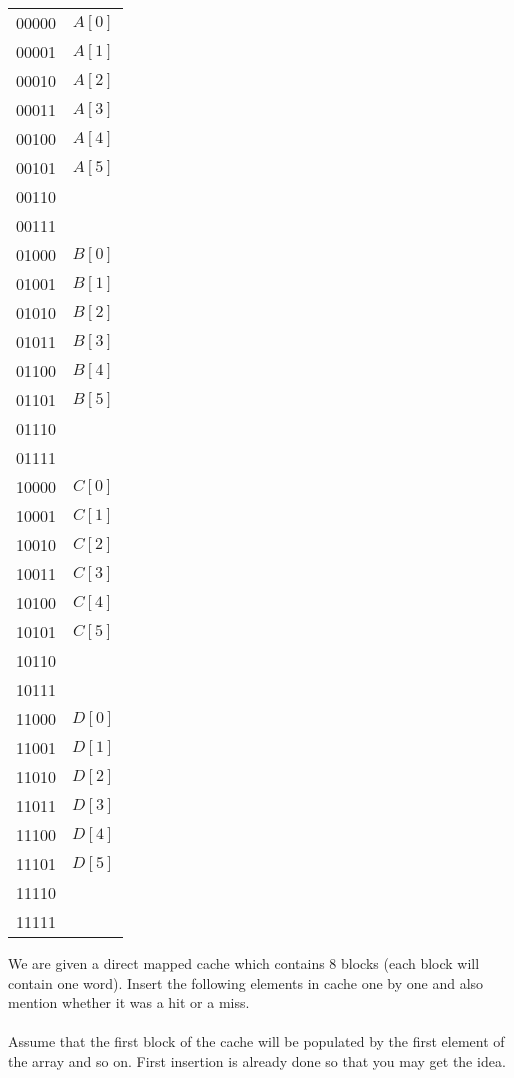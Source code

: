 \documentclass{article}
\begin{document}
\begin{table}[h]
    \begin{tabular}{|c|c|}
        \hline
        00000 & $A[0]$ \\
        00001 & $A[1]$ \\
        00010 & $A[2]$ \\
        00011 & $A[3]$ \\
        00100 & $A[4]$ \\
        00101 & $A[5]$ \\
        00110 & \\
        00111 & \\
        01000 & $B[0]$ \\
        01001 & $B[1]$ \\
        01010 & $B[2]$ \\
        01011 & $B[3]$ \\
        01100 & $B[4]$ \\
        01101 & $B[5]$ \\
        01110 & \\
        01111 & \\
        10000 & $C[0]$ \\
        10001 & $C[1]$ \\
        10010 & $C[2]$ \\
        10011 & $C[3]$ \\
        10100 & $C[4]$ \\
        10101 & $C[5]$ \\
        10110 & \\
        10111 & \\
        11000 & $D[0]$ \\
        11001 & $D[1]$ \\
        11010 & $D[2]$ \\
        11011 & $D[3]$ \\
        11100 & $D[4]$ \\
        11101 & $D[5]$ \\
        11110 & \\
        11111 & \\
        \hline
    \end{tabular}
\end{table}

\vspace*{0.5 cm}
We are given a direct mapped cache which contains 8 blocks (each block will contain one word).
Insert the following elements in cache one by one and also mention whether it was a hit or a miss.
\\
\\Assume that the first block of the cache will be populated by the first element of the array and so
on. First insertion is already done so that you may get the idea.
\end{document}
